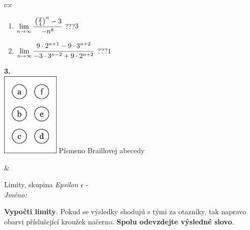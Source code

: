 \documentclass[10pt]{report}
\begin{document}
\begin{tabular}{c:c}
\begin{minipage}[c][104.5mm][t]{0.5\linewidth}
\begin{center}
\begin{minipage}{0.79\linewidth}
\begin{center}
\begin{varwidth}{\linewidth}
\begin{enumerate}
\item $\lim\limits_{n\to\infty}\cfrac{\left(\frac{2}{4}\right)^n -3}{-n^{8}}$\quad \dotfill\; ???\;\dotfill \quad $3$
\item $\lim\limits_{n\to\infty}\cfrac{9\cdot 2^{n+1}-9\cdot 3^{n+2}}{-3\cdot 3^{n-2}+9\cdot 2^{n+2}}$\quad \dotfill\; ???\;\dotfill \quad $1$
\end{enumerate}
\end{varwidth}
\end{center}
\end{minipage}
\begin{minipage}{0.20\linewidth}
\begin{center}
{\Huge\bfseries 3.} \\[2mm]
\includegraphics[height=40mm]{../images/braille.png}
{\small Písmeno Braillovej abecedy}
\end{center}
\end{minipage}
\end{center}
\end{minipage}
&
\begin{minipage}[c][104.5mm][t]{0.5\linewidth}
\begin{center}
\vspace{7mm}
{\huge Limity, skupina \textit{Epsilon $\epsilon$} -}\\[5mm]
\textit{Jméno:}\phantom{xxxxxxxxxxxxxxxxxxxxxxxxxxxxxxxxxxxxxxxxxxxxxxxxxxxxxxxxxxxxxxxxx}\\[5mm]
\begin{minipage}{0.95\linewidth}
\begin{center}
\textbf{Vypočti limity}. Pokud se výsledky shodujú s tými za otazníky, tak napravo\\obarvi příslušející kroužek načerno. \textbf{Spolu odevzdejte výsledné slovo}.
\end{center}
\end{minipage}
\\[1mm]
\begin{minipage}{0.79\linewidth}
\begin{center}
\begin{varwidth}{\linewidth}

\end{varwidth}
\end{center}
\end{minipage}
\end{center}
\end{minipage}
\end{tabular}
\end{document}
